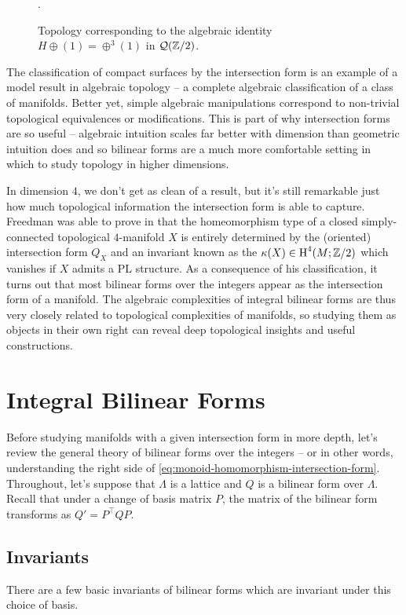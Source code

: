 \begin{figure}
	\centering
	\medskip
	\caption{Topology corresponding to the algebraic identity $H\oplus (1)=\oplus^3 (1)$ in $\mathcal{Q}(\mathbb{Z}/2)$.}\label{fig:compact-surfaces-intersection-form-identity}.
\end{figure}

The classification of compact surfaces by the intersection form is an example of a model result in algebraic topology -- a complete algebraic classification of a class of manifolds. Better yet, simple algebraic manipulations correspond to non-trivial topological equivalences or modifications. This is part of why intersection forms are so useful -- algebraic intuition scales far better with dimension than geometric intuition does and so bilinear forms are a much more comfortable setting in which to study topology in higher dimensions.

In dimension $4$, we don't get as clean of a result, but it's still remarkable just how much topological information the intersection form is able to capture. Freedman was able to prove in \cite{freedman1982} that the homeomorphism type of a closed simply-connected topological $4$-manifold $X$ is entirely determined by the (oriented) intersection form $Q_X$ and an invariant known as the  $\kappa(X)\in \operatorname{H}^4(M;\mathbb{Z}/2)$ which vanishes if $X$ admits a PL structure. As a consequence of his classification, it turns out that most bilinear forms over the integers appear as the intersection form of a manifold.
The algebraic complexities of integral bilinear forms are thus very closely related to topological complexities of manifolds, so studying them as objects in their own right can reveal deep topological insights and useful constructions.

\section{Integral Bilinear Forms}\label{sec:integral-bilinear-forms}
Before studying manifolds with a given intersection form in more depth, let's review the general theory of bilinear forms over the integers -- or in other words, understanding the right side of \cref{eq:monoid-homomorphism-intersection-form}. Throughout, let's suppose that $\Lambda$ is a lattice and $Q$ is a bilinear form over $\Lambda$. Recall that under a change of basis matrix $P$, the matrix of the bilinear form transforms as $Q'= P^\intercal QP$.

\subsection{Invariants}\label{sec:integral-bilinear-forms-invariants}
There are a few basic invariants of bilinear forms which are invariant under this choice of basis.

